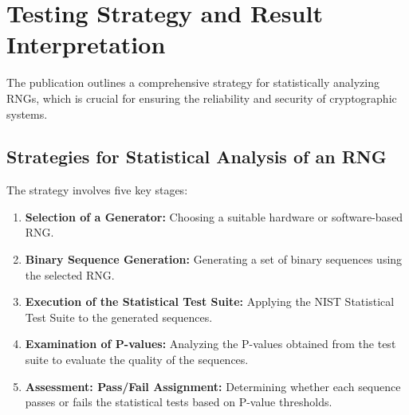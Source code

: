 \documentclass[12pt,openany]{book}
\theoremstyle{definition}
\begin{document}
	\section{Testing Strategy and Result Interpretation}
	The publication outlines a comprehensive strategy for statistically analyzing RNGs, which is crucial for ensuring the reliability and security of cryptographic systems.
	
	\subsection{Strategies for Statistical Analysis of an RNG}
	The strategy involves five key stages:
	\begin{enumerate}
		\item \textbf{Selection of a Generator:} Choosing a suitable hardware or software-based RNG.
		\item \textbf{Binary Sequence Generation:} Generating a set of binary sequences using the selected RNG.
		\item \textbf{Execution of the Statistical Test Suite:} Applying the NIST Statistical Test Suite to the generated sequences.
		\item \textbf{Examination of P-values:} Analyzing the P-values obtained from the test suite to evaluate the quality of the sequences.
		\item \textbf{Assessment: Pass/Fail Assignment:} Determining whether each sequence passes or fails the statistical tests based on P-value thresholds.
	\end{enumerate}
	
\end{document}
